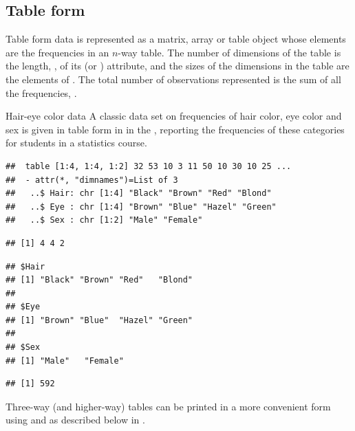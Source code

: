 \documentclass[11pt]{book}
\renewenvironment{knitrout}{\small\renewcommand{\baselinestretch}{.85}}{} %
\begin{document}
\subsection{Table form}
Table form data is represented as a matrix, array or table object
whose elements are the frequencies in an $n$-way table.
The number of dimensions of the table is the length, 
, of its
 (or ) attribute, and the sizes of the
dimensions in the table are the elements of .
The total number of observations represented is the sum of
all the frequencies, .

\begin{Example}[ch2-hec]{Hair-eye color data}
A classic data set on frequencies of hair color, eye color and
sex is given in table form in  in the 
, reporting the frequencies of these
categories for  students in
a statistics course.
\begin{knitrout}
\color{fgcolor}\begin{kframe}
\begin{alltt}
 \hlstd{=}\hlstd{)}    
                
\end{alltt}
\begin{verbatim}
##  table [1:4, 1:4, 1:2] 32 53 10 3 11 50 10 30 10 25 ...
##  - attr(*, "dimnames")=List of 3
##   ..$ Hair: chr [1:4] "Black" "Brown" "Red" "Blond"
##   ..$ Eye : chr [1:4] "Brown" "Blue" "Hazel" "Green"
##   ..$ Sex : chr [1:2] "Male" "Female"
\end{verbatim}
\begin{alltt}
                
\end{alltt}
\begin{verbatim}
## [1] 4 4 2
\end{verbatim}
\begin{alltt}
           
\end{alltt}
\begin{verbatim}
## $Hair
## [1] "Black" "Brown" "Red"   "Blond"
## 
## $Eye
## [1] "Brown" "Blue"  "Hazel" "Green"
## 
## $Sex
## [1] "Male"   "Female"
\end{verbatim}
\begin{alltt}
                
\end{alltt}
\begin{verbatim}
## [1] 592
\end{verbatim}
\end{kframe}
\end{knitrout}
Three-way (and higher-way) tables can be printed in a more convenient
form using  and  as described below
in .
\end{Example}
\end{document}
